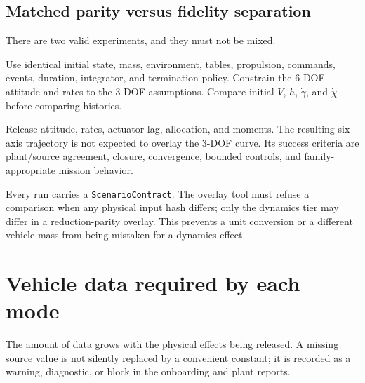 \documentclass[11pt]{article}
\begin{document}
\subsection{Matched parity versus fidelity separation}

There are two valid experiments, and they must not be mixed.

\begin{description}[leftmargin=1.45in,labelwidth=1.25in,style=sameline]
  \item[Reduction parity] Use identical initial state, mass, environment,
    tables, propulsion, commands, events, duration, integrator, and termination
    policy. Constrain the 6-DOF attitude and rates to the 3-DOF assumptions.
    Compare initial $\dot V$, $\dot h$, $\dot\gamma$, and $\dot\chi$ before
    comparing histories.
  \item[Fidelity separation] Release attitude, rates, actuator lag, allocation,
    and moments. The resulting six-axis trajectory is not expected to overlay
    the 3-DOF curve. Its success criteria are plant/source agreement, closure,
    convergence, bounded controls, and family-appropriate mission behavior.
\end{description}

Every run carries a \texttt{ScenarioContract}. The overlay tool must refuse a
comparison when any physical input hash differs; only the dynamics tier may
differ in a reduction-parity overlay. This prevents a unit conversion or a
different vehicle mass from being mistaken for a dynamics effect.

\section{Vehicle data required by each mode}
\label{sec:data-contract}

The amount of data grows with the physical effects being released. A missing
source value is not silently replaced by a convenient constant; it is recorded
as a warning, diagnostic, or block in the onboarding and plant reports.
\end{document}
